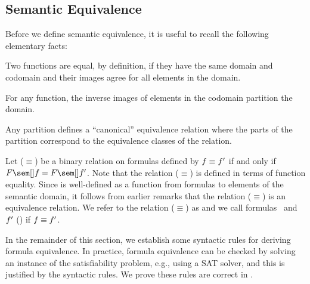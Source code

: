 \subsection{Semantic Equivalence}
\label{sec:feq}

Before we define semantic equivalence, it is useful to recall the following elementary facts:
%
\begin{inparaenum}[(1)]
  \item Two functions are equal, by definition, if they have the same domain and codomain and their images agree for all elements in the domain.
  \item For any function, the inverse images of elements in the codomain partition the domain.
  \item Any partition defines a ``canonical'' equivalence relation where the parts of the partition correspond to the equivalence classes of the relation.
\end{inparaenum}

Let ($\equiv$) be a binary relation on formulas defined by $\color{black}f \equiv \color{black}f'$ if and only if $\fSem{\fE} = \fSem{\fE'}$.
Note that the relation ($\equiv$) is defined in terms of function equality.
Since \fSem{\cdot} is well-defined as a function from formulas to elements of the semantic domain, it follows from earlier remarks that the relation ($\equiv$) is an equivalence relation.
We refer to the relation ($\equiv$) as  and we call formulas \fE\ and $\color{black}f'$ ()  if $\color{black}f \equiv \color{black}f'$.

In the remainder of this section, we establish some syntactic rules for deriving formula equivalence.
In practice, formula equivalence can be checked by solving an instance of the satisfiability problem, e.g., using a SAT solver, and this is justified by the syntactic rules.
We prove these rules are correct in .

